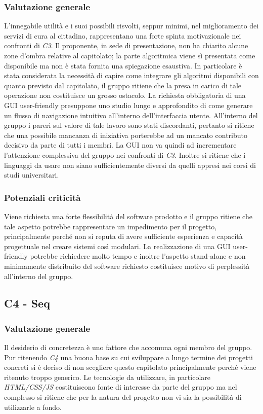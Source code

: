         \subsubsection{Valutazione generale}
        L'innegabile utilità e i suoi possibili risvolti, seppur minimi, nel miglioramento dei servizi di cura al cittadino, rappresentano una forte spinta motivazionale nei confronti di \emph{C3}. Il proponente, in sede di presentazione, non ha chiarito alcune zone d'ombra relative al capitolato; la parte algoritmica viene sì presentata come disponibile ma non è stata fornita una spiegazione esaustiva. In particolare è stata considerata la necessità di capire come integrare gli algoritmi disponibili con quanto previsto dal capitolato, il gruppo ritiene che la presa in carico di tale operazione non costituisce un grosso ostacolo. La richiesta obbligatoria di una GUI user-friendly presuppone uno studio lungo e approfondito di come generare un flusso di navigazione intuitivo all'interno dell'interfaccia utente. All'interno del gruppo i pareri sul valore di tale lavoro sono stati discordanti, pertanto si ritiene che una possibile mancanza di iniziativa porterebbe ad un mancato contributo decisivo da parte di tutti i membri. La GUI non va quindi ad incrementare l'attenzione complessiva del gruppo nei confronti di \emph{C3}. Inoltre si ritiene che i linguaggi da usare non siano sufficientemente diversi da quelli appresi nei corsi di studi universitari.
        \subsubsection{Potenziali criticità}
        Viene richiesta una forte flessibilità del software prodotto e il gruppo ritiene che tale aspetto potrebbe rappresentare un impedimento per il progetto, principalmente perché non si reputa di avere sufficiente esperienza e capacità progettuale nel creare sistemi così modulari. La realizzazione di una GUI user-friendly potrebbe richiedere molto tempo e inoltre l'aspetto stand-alone e non minimamente distribuito del software richiesto costituisce motivo di perplessità all'interno del gruppo.
        
\subsection{C4 - Seq}
        \subsubsection{Valutazione generale}
        Il desiderio di concretezza è uno fattore che accomuna ogni membro del gruppo. Pur ritenendo \emph{C4} una buona base su cui sviluppare a lungo termine dei progetti concreti si è deciso di non scegliere questo capitolato principalmente perché viene ritenuto troppo generico.
        Le tecnologie da utilizzare, in particolare \emph{HTML/CSS/JS} costituiscono fonte di interesse da parte del gruppo ma nel complesso si ritiene che per la natura del progetto non vi sia la possibilità di utilizzarle a fondo.
        
